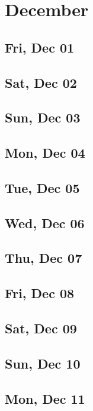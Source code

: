 \chapter{December}
	\section{Fri, Dec 01}
		
	\section{Sat, Dec 02}
		
	\section{Sun, Dec 03}
		
	\section{Mon, Dec 04}
		
	\section{Tue, Dec 05}
		
	\section{Wed, Dec 06}
		
	\section{Thu, Dec 07}
		
	\section{Fri, Dec 08}
		
	\section{Sat, Dec 09}
		
	\section{Sun, Dec 10}
		
	\section{Mon, Dec 11}
		
